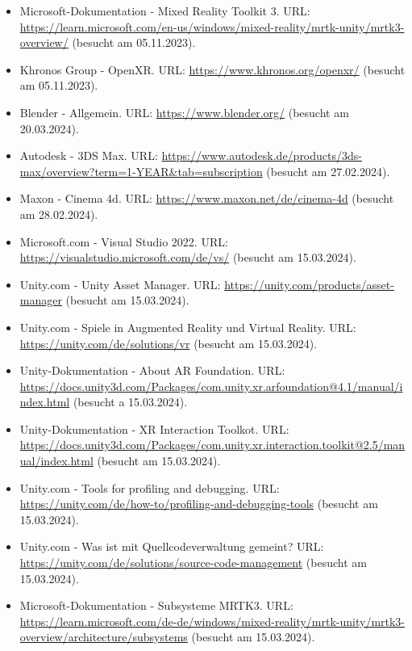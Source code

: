 \begin{itemize}[leftmargin=0pt]
    \item Microsoft-Dokumentation - Mixed Reality Toolkit 3. {\scriptsize URL:} \url{https://learn.microsoft.com/en-us/windows/mixed-reality/mrtk-unity/mrtk3-overview/} (besucht am 05.11.2023).
    \item Khronos Group - OpenXR. {\scriptsize URL:} \url{https://www.khronos.org/openxr/} (besucht am 05.11.2023).
    \item Blender - Allgemein. {\scriptsize URL:} \url{https://www.blender.org/} (besucht am 20.03.2024).
    \item Autodesk - 3DS Max. {\scriptsize URL:} \url{https://www.autodesk.de/products/3ds-max/overview?term=1-YEAR&tab=subscription} (besucht am 27.02.2024).
    \item Maxon - Cinema 4d. {\scriptsize URL:} \url{https://www.maxon.net/de/cinema-4d} (besucht am 28.02.2024).
    \item Microsoft.com - Visual Studio 2022. {\scriptsize URL:} \url{https://visualstudio.microsoft.com/de/vs/} (besucht am 15.03.2024).
    \item Unity.com - Unity Asset Manager. {\scriptsize URL:} \url{https://unity.com/products/asset-manager} (besucht am 15.03.2024).
    \item Unity.com - Spiele in Augmented Reality und Virtual Reality. {\scriptsize URL:} \url{https://unity.com/de/solutions/vr} (besucht am 15.03.2024).
    \item Unity-Dokumentation - About AR Foundation. {\scriptsize URL:} \url{https://docs.unity3d.com/Packages/com.unity.xr.arfoundation@4.1/manual/index.html} (besucht a 15.03.2024).
    \item Unity-Dokumentation - XR Interaction Toolkot. {\scriptsize URL:} \url{https://docs.unity3d.com/Packages/com.unity.xr.interaction.toolkit@2.5/manual/index.html} (besucht am 15.03.2024).
    \item Unity.com - Tools for profiling and debugging. {\scriptsize URL:} \url{https://unity.com/de/how-to/profiling-and-debugging-tools} (besucht am 15.03.2024).
    \item Unity.com - Was ist mit Quellcodeverwaltung gemeint? {\scriptsize URL:} \url{https://unity.com/de/solutions/source-code-management} (besucht am 15.03.2024).
    \item Microsoft-Dokumentation - Subsysteme MRTK3. {\scriptsize URL:} \url{https://learn.microsoft.com/de-de/windows/mixed-reality/mrtk-unity/mrtk3-overview/architecture/subsystems} (besucht am 15.03.2024).

\end{itemize}
